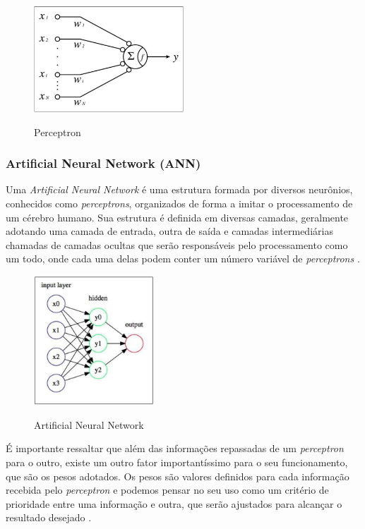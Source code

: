 \begin{figure}[!htb]
	\centering
	\caption{Perceptron}
	\includegraphics[width=0.50\textwidth]{img/perceptron.jpg}
	\label{fig:perceptron}
\end{figure}

\subsubsection{Artificial Neural Network (ANN)}
Uma \emph{Artificial Neural Network} é uma estrutura formada por diversos neurônios, conhecidos como \emph{perceptrons}, organizados de forma a imitar o processamento de um cérebro humano. Sua estrutura é definida em diversas camadas, geralmente adotando uma camada de entrada, outra de saída e camadas intermediárias chamadas de camadas ocultas que serão responsáveis pelo processamento como um todo, onde cada uma delas podem conter um número variável de \emph{perceptrons} \cite{deepLearningTensorFlow}.

\begin{figure}[!htb]
	\centering
	\caption{Artificial Neural Network}
	\includegraphics[width=0.40\textwidth]{img/neuralNetwork.jpg}
	\label{fig:neuralNetwork}
\end{figure}

É importante ressaltar que além das informações repassadas de um \emph{perceptron} para o outro, existe um outro fator importantíssimo para o seu funcionamento, que são os pesos adotados. Os pesos são valores definidos para cada informação recebida pelo \emph{perceptron} e podemos pensar no seu uso como um critério de prioridade entre uma informação e outra, que serão ajustados para alcançar o resultado desejado \cite{deepLearningTensorFlow}.

